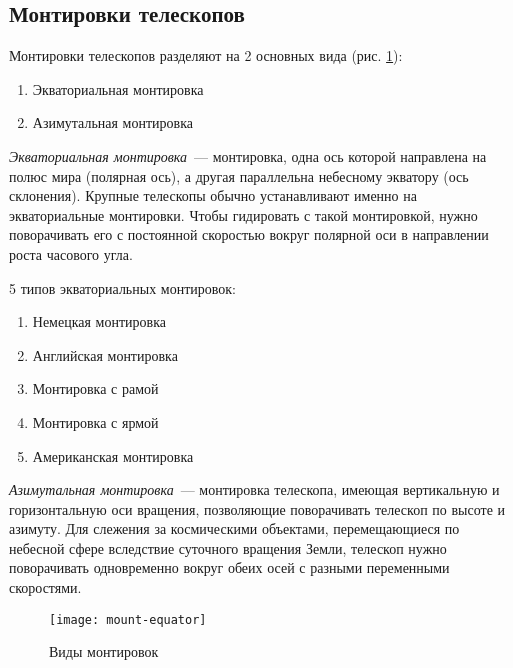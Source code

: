 \subsection{Монтировки телескопов}

Монтировки телескопов разделяют на 2 основных вида (рис. \ref{mount-equator}):
\begin{enumerate}
\item Экваториальная монтировка
\item Азимутальная монтировка
\end{enumerate}

\textit{Экваториальная монтировка}~--- монтировка, одна ось которой направлена на полюс мира (полярная ось), а другая параллельна небесному экватору (ось склонения). Крупные телескопы обычно устанавливают именно на экваториальные монтировки. Чтобы гидировать с такой монтировкой, нужно поворачивать его с постоянной скоростью вокруг полярной оси в направлении роста часового угла.

5 типов экваториальных монтировок:
\begin{enumerate}
\item Немецкая монтировка
\item Английская монтировка
\item Монтировка с рамой
\item Монтировка с ярмой
\item Американская монтировка
\end{enumerate}

\textit{Азимутальная монтировка}~--- монтировка телескопа, имеющая вертикальную и горизонтальную оси вращения, позволяющие поворачивать телескоп по высоте и азимуту. Для слежения за космическими объектами, перемещающиеся по небесной сфере вследствие суточного вращения Земли, телескоп нужно поворачивать одновременно вокруг обеих осей с разными переменными скоростями.

\begin{figure}[!h]\label{mount-equator}
\centering
\texttt{[image: mount-equator]}
\caption{Виды монтировок}
\end{figure}